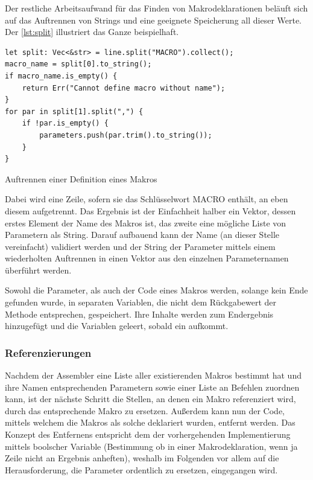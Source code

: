 Der restliche Arbeitsaufwand für das Finden von Makrodeklarationen beläuft sich auf das Auftrennen von Strings und eine geeignete Speicherung all dieser Werte. Der \cref{lst:split} illustriert das Ganze beispielhaft.

\begin{listing}[th]
\begin{verbatim}
let split: Vec<&str> = line.split("MACRO").collect();
macro_name = split[0].to_string();
if macro_name.is_empty() {
    return Err("Cannot define macro without name");
}
for par in split[1].split(",") {
    if !par.is_empty() {
        parameters.push(par.trim().to_string());
    }
}
\end{verbatim}
\label{lst:split}
\caption{Auftrennen einer Definition eines Makros}
\end{listing}

Dabei wird eine Zeile, sofern sie das Schlüsselwort \glqq MACRO\grqq{} enthält, an eben diesem aufgetrennt. Das Ergebnis ist der Einfachheit halber ein Vektor, dessen erstes Element der Name des Makros ist, das zweite eine mögliche Liste von Parametern als String. Darauf aufbauend kann der Name (an dieser Stelle vereinfacht) validiert werden und der String der Parameter mittels einem wiederholten Auftrennen in einen Vektor aus den einzelnen Parameternamen überführt werden.

Sowohl die Parameter, als auch der Code eines Makros werden, solange kein Ende gefunden wurde, in separaten Variablen, die nicht dem Rückgabewert der Methode entsprechen, gespeichert. Ihre Inhalte werden zum Endergebnis hinzugefügt und die Variablen geleert, sobald ein  aufkommt.

\subsubsection{Referenzierungen}\label{chap:macro:references}

Nachdem der Assembler eine Liste aller existierenden Makros bestimmt hat und ihre Namen entsprechenden Parametern sowie einer Liste an Befehlen zuordnen kann, ist der nächste Schritt die Stellen, an denen ein Makro referenziert wird, durch das entsprechende Makro zu ersetzen. Außerdem kann nun der Code, mittels welchem die Makros als solche deklariert wurden, entfernt werden. Das Konzept des Entfernens entspricht dem der vorhergehenden Implementierung mittels boolscher Variable (Bestimmung ob in einer Makrodeklaration, wenn ja Zeile nicht an Ergebnis anheften), weshalb im Folgenden vor allem auf die Herausforderung, die Parameter ordentlich zu ersetzen, eingegangen wird.


